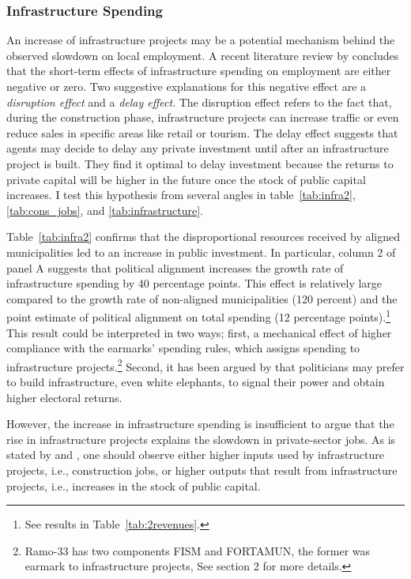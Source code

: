 \documentclass[dv_diss_main.tex]{subfiles}
\begin{document}
\subsubsection{Infrastructure Spending} 
An increase of infrastructure projects may be a potential mechanism behind the observed slowdown on local employment.
A recent literature review by \cite{ramey2020macroeconomic} concludes that the short-term effects of infrastructure spending on employment are either negative or zero. 
Two suggestive explanations for this negative effect are a \textit{disruption effect} and a \textit{delay effect}. The disruption effect refers to the fact that, during the construction phase, infrastructure projects can increase traffic or even reduce sales in specific areas like retail or tourism. 
 The delay effect suggests that agents may decide to delay any private investment until after an infrastructure project is built. They find it optimal to delay investment because the returns to private capital will be higher in the future once the stock of public capital increases. I test this hypothesis from several angles in table~\ref{tab:infra2},\ref{tab:cons_jobs}, and \ref{tab:infrastructure}. 

Table~\ref{tab:infra2} confirms that the disproportional resources received by aligned municipalities led to an increase in public investment. In particular, column 2 of panel A suggests that political alignment increases the growth rate of infrastructure spending by 40 percentage points. This effect is relatively large compared to the growth rate of non-aligned municipalities (120 percent) and the point estimate of political alignment on total spending (12 percentage points).\footnote{See results in Table~\ref{tab:2revenues}. } This result could be interpreted in two ways; first, a mechanical effect of higher compliance with the earmarks' spending rules, which assigns spending to infrastructure projects.\footnote{Ramo-33 has two components FISM and FORTAMUN, the former was earmark to infrastructure projects, See section 2 for more details.}  Second, it has been argued by \cite{robinson2005white} that politicians may prefer to build infrastructure, even white elephants, to signal their power and obtain higher electoral returns. 

However, the increase in infrastructure spending is insufficient to argue that the rise in infrastructure projects explains the slowdown in private-sector jobs. As is stated by \cite{garin2019putting} and \cite{ramey2020macroeconomic}, one should observe either higher inputs used by infrastructure projects, i.e., construction jobs, or higher outputs that result from infrastructure projects, i.e., increases in the stock of public capital. 
\end{document}
